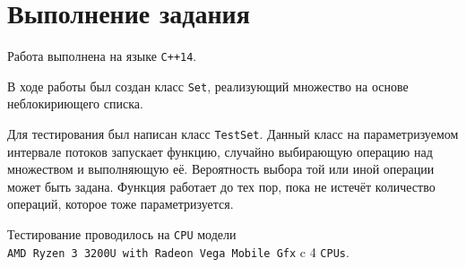 \section{Выполнение задания}

Работа выполнена на языке \verb|C++14|.

В ходе работы был создан класс \verb|Set|,
реализующий множество на основе неблокириющего
списка.

Для тестирования был написан класс \verb|TestSet|.
Данный класс на параметризуемом интервале
потоков запускает функцию, случайно выбирающую
операцию над множеством и выполняющую её.
Вероятность выбора той или иной операции
может быть задана. Функция работает до тех
пор, пока не истечёт количество операций,
которое тоже параметризуется. 

Тестирование проводилось на \verb|CPU| модели\\
\verb|AMD Ryzen 3 3200U with Radeon Vega Mobile Gfx|
c 4 \verb|CPUs|.

